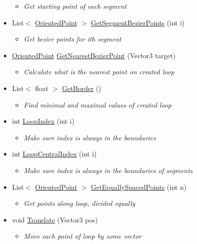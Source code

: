 \begin{itemize}
\begin{itemize}\small\item[] \em Get starting point of each segment \end{itemize}\item[]  
List$<$ \mbox{\hyperlink{classRacingGameBot_1_1Terrains_1_1OrientedPoint}{OrientedPoint}} $>$ \mbox{\hyperlink{classRacingGameBot_1_1Terrains_1_1Loop_af567446e2e660a5f194c875bb1373e02}{GetSegmentBezierPoints}} (int i)
\begin{itemize}\small\item[] \em Get bezier points for ith segment \end{itemize}\item[]  
\mbox{\hyperlink{classRacingGameBot_1_1Terrains_1_1OrientedPoint}{OrientedPoint}} \mbox{\hyperlink{classRacingGameBot_1_1Terrains_1_1Loop_a036e5e639b03e7c5dd45d6cb23f5d110}{GetNearestBezierPoint}} (Vector3 target)
\begin{itemize}\small\item[] \em Calculate what is the nearest point on created loop \end{itemize}\item[]  
List$<$ float $>$ \mbox{\hyperlink{classRacingGameBot_1_1Terrains_1_1Loop_a3818b085637c0737ad6b3e44f3665f28}{GetBorder}} ()
\begin{itemize}\small\item[] \em Find minimal and maximal values of created loop \end{itemize}\item[]  
int \mbox{\hyperlink{classRacingGameBot_1_1Terrains_1_1Loop_a8c4034ca8f34335c4221e4a53342b1ea}{LoopIndex}} (int i)
\begin{itemize}\small\item[] \em Make sure index is always in the boundaries \end{itemize}\item[]  
int \mbox{\hyperlink{classRacingGameBot_1_1Terrains_1_1Loop_ae0a6c89f25315ca30fab524a87130096}{LoopCentralIndex}} (int i)
\begin{itemize}\small\item[] \em Make sure index is always in the boundaries of segments \end{itemize}\item[]  
List$<$ \mbox{\hyperlink{classRacingGameBot_1_1Terrains_1_1OrientedPoint}{OrientedPoint}} $>$ \mbox{\hyperlink{classRacingGameBot_1_1Terrains_1_1Loop_a2f28c5b2afa893f98f358f154c3fa7da}{GetEquallySpacedPoints}} (int n)
\begin{itemize}\small\item[] \em Get points along loop, divided equally \end{itemize}\item[]  
void \mbox{\hyperlink{classRacingGameBot_1_1Terrains_1_1Loop_acf6682358b749df745fa3cf36977c29a}{Translate}} (Vector3 pos)
\begin{itemize}\small\item[] \em Move each point of loop by some vector \end{itemize}\end{itemize}

